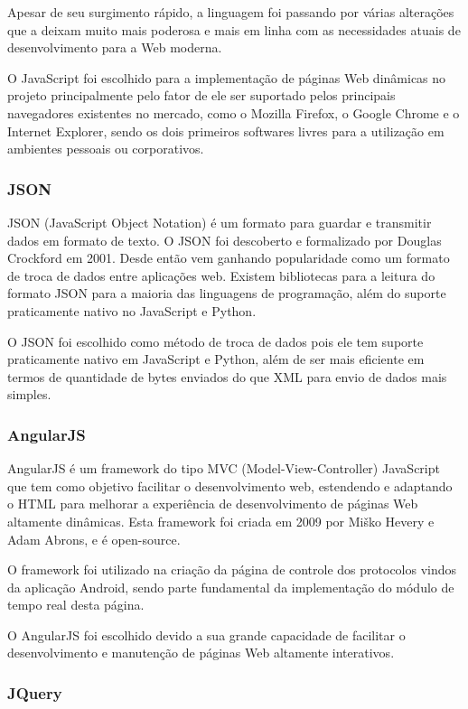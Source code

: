 \documentclass[
	article,			%
	11pt,				%
	oneside,			%
	a4paper,			%
	english,			%
	brazil,				%
	sumario=tradicional
	]{abntex2}
\begin{document}
Apesar de seu surgimento rápido, a linguagem foi passando por várias alterações
que a deixam muito mais poderosa e mais em linha com as necessidades atuais de
desenvolvimento para a Web moderna.

O JavaScript foi escolhido para a implementação de páginas Web dinâmicas no
projeto principalmente pelo fator de ele ser suportado pelos principais
navegadores existentes no mercado, como o Mozilla Firefox, o Google Chrome e o
Internet Explorer, sendo os dois primeiros softwares livres para a utilização em
ambientes pessoais ou corporativos.


\subsubsection{JSON}

JSON (JavaScript Object Notation) é um formato para guardar e transmitir dados
em formato de texto. O JSON foi descoberto e formalizado por Douglas Crockford em
2001. \cite{json} Desde então vem ganhando popularidade como um formato de troca de
dados entre aplicações web. Existem bibliotecas para a leitura do formato JSON
para a maioria das linguagens de programação, além do suporte praticamente
nativo no JavaScript e Python.

O JSON foi escolhido como método de troca de dados pois ele tem suporte
praticamente nativo em JavaScript e Python, além de ser mais eficiente em termos
de quantidade de bytes enviados do que XML para envio de dados mais simples.

\subsubsection{AngularJS}

AngularJS é um framework do tipo MVC (Model-View-Controller) JavaScript que
tem como objetivo facilitar o desenvolvimento web, estendendo e adaptando o
HTML para melhorar a experiência de desenvolvimento de páginas Web altamente
dinâmicas. Esta framework foi criada em 2009 por Miško Hevery e Adam
Abrons, e é open-source. \cite{angularjs}

O framework foi utilizado na criação da página de controle dos protocolos
vindos da aplicação Android, sendo parte fundamental da implementação do módulo
de tempo real desta página.

O AngularJS foi escolhido devido a sua grande capacidade de facilitar o
desenvolvimento e manutenção de páginas Web altamente interativos.

\subsubsection{JQuery}
\end{document}
